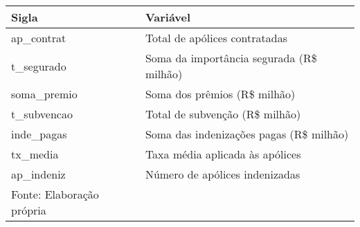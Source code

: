 \begin{center}
\begin{tabular}{ll}
\hline 
Sigla & Variável  \tabularnewline
\hline 
ap\_contrat    & Total de apólices contratadas                         \\
t\_segurado    & Soma da importância segurada (R\$ milhão)             \\
soma\_premio   & Soma dos prêmios (R\$ milhão)                         \\
t\_subvencao   & Total de subvenção (R\$ milhão)                       \\
inde\_pagas    & Soma das indenizações pagas (R\$ milhão)              \\
tx\_media      & Taxa média aplicada às apólices                       \\
ap\_indeniz    & Número de apólices indenizadas                        \\ 
\hline 
\vspace{0.1cm}
\footnotesize{Fonte: Elaboração própria}
\end{tabular}
\end{center}